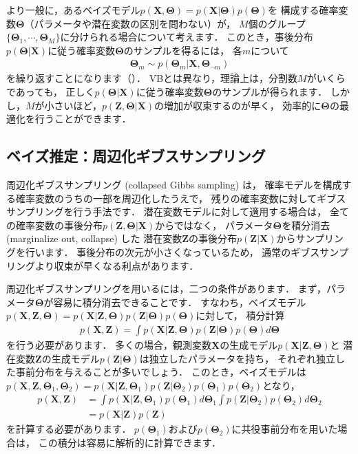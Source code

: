 より一般に，あるベイズモデル$p(\bm{X},\bm\Theta)=p(\bm{X}|\bm\Theta)p(\bm\Theta)$を
構成する確率変数$\bm\Theta$（パラメータや潜在変数の区別を問わない）が，
$M$個のグループ$\{\bm\Theta_1,\cdots,\bm\Theta_M\}$に分けられる場合について考えます．
このとき，事後分布$p(\bm\Theta|\bm{X})$に従う確率変数$\bm\Theta$のサンプルを得るには，
各$m$について
\begin{align}
\bm\Theta_m
\sim
p(\bm\Theta_m | \bm{X},\bm\Theta_{\neg m})
\end{align}
を繰り返すことになります（）．
VBとは異なり，理論上は，分割数$M$がいくらであっても，
正しく$p(\bm\Theta|\bm{X})$に従う確率変数$\bm\Theta$のサンプルが得られます．
しかし，$M$が小さいほど，$p(\bm{Z},\bm\Theta|\bm{X})$の増加が収束するのが早く，
効率的に$\bm\Theta$の最適化を行うことができます．

\subsection{ベイズ推定：周辺化ギブスサンプリング}

周辺化ギブスサンプリング (collapsed Gibbs sampling) は，
確率モデルを構成する確率変数のうちの一部を周辺化したうえで，
残りの確率変数に対してギブスサンプリングを行う手法です．
潜在変数モデルに対して適用する場合は，
全ての確率変数の事後分布$p(\bm{Z},\bm\Theta|\bm{X})$からではなく，
パラメータ$\bm\Theta$を積分消去 (marginalize out, collapse) した
潜在変数$\bm{Z}$の事後分布$p(\bm{Z}|\bm{X})$からサンプリングを行います．
事後分布の次元が小さくなっているため，
通常のギブスサンプリングより収束が早くなる利点があります．

周辺化ギブスサンプリングを用いるには，二つの条件があります．
まず，パラメータ$\bm\Theta$が容易に積分消去できることです．
すなわち，ベイズモデル$p(\bm{X},\bm{Z},\bm\Theta)
= p(\bm{X}|\bm{Z},\bm\Theta) p(\bm{Z} | \bm\Theta) p(\bm\Theta)$に対して，
積分計算
\begin{align}
p(\bm{X},\bm{Z}) = \int p(\bm{X}|\bm{Z},\bm\Theta) p(\bm{Z} | \bm\Theta) p(\bm\Theta) d\bm\Theta
\end{align}
を行う必要があります．
多くの場合，観測変数$\bm{X}$の生成モデル$p(\bm{X}|\bm{Z},\bm\Theta)$と
潜在変数$\bm{Z}$の生成モデル$p(\bm{Z} | \bm\Theta)$は独立したパラメータを持ち，
それぞれ独立した事前分布を与えることが多いでしょう．
このとき，ベイズモデルは$p(\bm{X},\bm{Z},\bm\Theta_1,\bm\Theta_2) 
= p(\bm{X}|\bm{Z},\bm\Theta_1) p(\bm{Z} | \bm\Theta_2) p(\bm\Theta_1) p(\bm\Theta_2)$となり，
\begin{align}
p(\bm{X},\bm{Z}) 
&= 
\int p(\bm{X}|\bm{Z},\bm\Theta_1) p(\bm\Theta_1) d\bm\Theta_1 
\int p(\bm{Z} | \bm\Theta_2) p(\bm\Theta_2) d\bm\Theta_2
\nonumber\\
&=
p(\bm{X}|\bm{Z}) p(\bm{Z})
\end{align}
を計算する必要があります．
$p(\bm\Theta_1)$および$p(\bm\Theta_2)$に共役事前分布を用いた場合は，
この積分は容易に解析的に計算できます．

